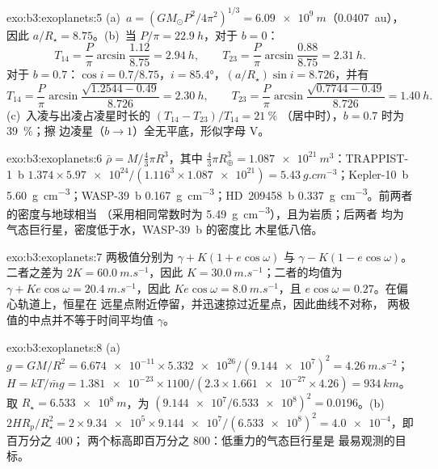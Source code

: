 \begin{solution}{exo:b3:exoplanets:5}
(a)~$a = (GM_\odot P^2/4\pi^2)^{1/3} = \qty{6.09e9}{m}$（\qty{0.0407}{au}），
因此 $a/R_\star = 8.75$。(b)~当 $P/\pi = \qty{22.9}{h}$，对于 $b = 0$：
\[
T_{14} = \frac P\pi\arcsin\frac{1.12}{8.75} = \qty{2.94}{h}, \qquad
T_{23} = \frac P\pi\arcsin\frac{0.88}{8.75} = \qty{2.31}{h}.
\]
对于 $b = 0.7$：$\cos i = 0.7/8.75$，$i = \ang{85.4}$，$(a/R_\star)\sin i =
8.726$，并有
\[
T_{14} = \frac P\pi\arcsin\frac{\sqrt{1.2544 - 0.49}}{8.726} = \qty{2.30}{h},
\qquad
T_{23} = \frac P\pi\arcsin\frac{\sqrt{0.7744 - 0.49}}{8.726} = \qty{1.40}{h}.
\]
(c)~入凌与出凌占凌星时长的 $(T_{14} - T_{23})/T_{14} = \qty{21}{\percent}$
（居中时），$b = 0.7$ 时为 \qty{39}{\percent}；擦
边凌星（$b \to 1$）全无平底，形似字母 V。
\end{solution}

\begin{solution}{exo:b3:exoplanets:6}
$\bar\rho = M/\tfrac43\pi R^3$，其中 $\tfrac43\pi R_\oplus^3 =
\qty{1.087e21}{m^3}$：TRAPPIST-1~b $1.374\times\num{5.97e24}/(1.116^3\times
\num{1.087e21}) = \qty{5.43}{g.cm^{-3}}$；Kepler-10~b
\qty{5.60}{g.cm^{-3}}；WASP-39~b \qty{0.167}{g.cm^{-3}}；HD~209458~b
\qty{0.337}{g.cm^{-3}}。前两者的密度与地球相当
（采用相同常数时为 \qty{5.49}{g.cm^{-3}}），且为岩质；后两者
均为气态巨行星，密度低于水，WASP-39~b 的密度比
木星低八倍。
\end{solution}

\begin{solution}{exo:b3:exoplanets:7}
两极值分别为 $\gamma + K(1 + e\cos\omega)$ 与 $\gamma - K(1 -
e\cos\omega)$。二者之差为 $2K = \qty{60.0}{m.s^{-1}}$，因此 $K =
\qty{30.0}{m.s^{-1}}$；二者的均值为 $\gamma + Ke\cos\omega =
\qty{20.4}{m.s^{-1}}$，因此 $Ke\cos\omega = \qty{8.0}{m.s^{-1}}$，且
$e\cos\omega = 0.27$。在偏心轨道上，恒星在
远星点附近停留，并迅速掠过近星点，因此曲线不对称，
两极值的中点并不等于时间平均值 $\gamma$。
\end{solution}

\begin{solution}{exo:b3:exoplanets:8}
(a)~$g = GM/R^2 = \num{6.674e-11}\times\num{5.332e26}/(\num{9.144e7})^2 =
\qty{4.26}{m.s^{-2}}$；$H = kT/\bar m g = \num{1.381e-23}\times1100/(2.3
\times\num{1.661e-27}\times4.26) = \qty{934}{km}$。取 $R_\star =
\qty{6.533e8}{m}$，为 $(\num{9.144e7}/\num{6.533e8})^2 =
\num{0.0196}$。(b)~$2HR_p/R_\star^2 = 2\times\num{9.34e5}\times
\num{9.144e7}/(\num{6.533e8})^2 = \num{4.0e-4}$，即百万分之 400；
两个标高即百万分之 800：低重力的气态巨行星是
最易观测的目标。
\end{solution}

